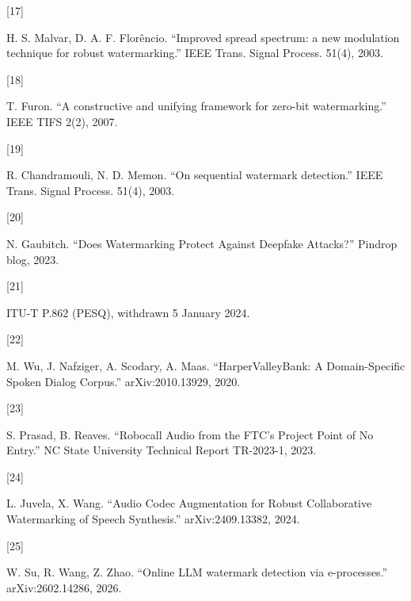 \documentclass[10pt,a4paper]{article}
\begin{document}
\hypertarget{ref-17}{{[}17{]}} H. S. Malvar, D. A. F. Florêncio. ``Improved spread spectrum: a new modulation technique for robust watermarking.'' IEEE Trans. Signal Process. 51(4), 2003.

\hypertarget{ref-18}{{[}18{]}} T. Furon. ``A constructive and unifying framework for zero-bit watermarking.'' IEEE TIFS 2(2), 2007.

\hypertarget{ref-19}{{[}19{]}} R. Chandramouli, N. D. Memon. ``On sequential watermark detection.'' IEEE Trans. Signal Process. 51(4), 2003.

\hypertarget{ref-20}{{[}20{]}} N. Gaubitch. ``Does Watermarking Protect Against Deepfake Attacks?'' Pindrop blog, 2023.

\hypertarget{ref-21}{{[}21{]}} ITU-T P.862 (PESQ), withdrawn 5 January 2024.

\hypertarget{ref-22}{{[}22{]}} M. Wu, J. Nafziger, A. Scodary, A. Maas. ``HarperValleyBank: A Domain-Specific Spoken Dialog Corpus.'' arXiv:2010.13929, 2020.

\hypertarget{ref-23}{{[}23{]}} S. Prasad, B. Reaves. ``Robocall Audio from the FTC's Project Point of No Entry.'' NC State University Technical Report TR-2023-1, 2023.

\hypertarget{ref-24}{{[}24{]}} L. Juvela, X. Wang. ``Audio Codec Augmentation for Robust Collaborative Watermarking of Speech Synthesis.'' arXiv:2409.13382, 2024.

\hypertarget{ref-25}{{[}25{]}} W. Su, R. Wang, Z. Zhao. ``Online LLM watermark detection via e-processes.'' arXiv:2602.14286, 2026.
\end{document}
